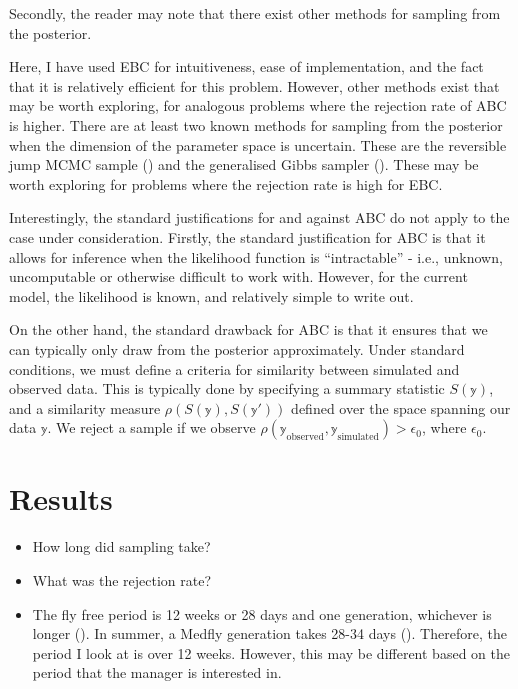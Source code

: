 \documentclass[
]{book}
\begin{document}
Secondly, the reader may note that there exist other methods for sampling from the posterior.

Here, I have used EBC for intuitiveness, ease of implementation, and the fact that it is relatively efficient for this problem. However, other methods exist that may be worth exploring, for analogous problems where the rejection rate of ABC is higher. There are at least two known methods for sampling from the posterior when the dimension of the parameter space is uncertain. These are the reversible jump MCMC sample (\citet{green1995}) and the generalised Gibbs sampler (\citet{keith2015}). These may be worth exploring for problems where the rejection rate is high for EBC.

Interestingly, the standard justifications for and against ABC do not apply to the case under consideration. Firstly, the standard justification for ABC is that it allows for inference when the likelihood function is ``intractable'' - i.e., unknown, uncomputable or otherwise difficult to work with. However, for the current model, the likelihood is known, and relatively simple to write out.

On the other hand, the standard drawback for ABC is that it ensures that we can typically only draw from the posterior approximately. Under standard conditions, we must define a criteria for similarity between simulated and observed data. This is typically done by specifying a summary statistic \(S(\mathbb y)\), and a similarity measure \(\rho(S(\mathbb y), S(\mathbb y'))\) defined over the space spanning our data \(\mathbb y\). We reject a sample if we observe \(\rho(\mathbb y_{\text{observed}}, \mathbb y_{\text{simulated}} ) > \epsilon_0\), where \(\epsilon_0\).

\hypertarget{results}{%
\section{Results}\label{results}}

\begin{itemize}
\item
  How long did sampling take?
\item
  What was the rejection rate?
\item
  The fly free period is 12 weeks or 28 days and one generation, whichever is longer (\citet{meats2005}). In summer, a Medfly generation takes 28-34 days (\citet{dpirdwa}). Therefore, the period I look at is over 12 weeks. However, this may be different based on the period that the manager is interested in.
\end{itemize}
\end{document}
